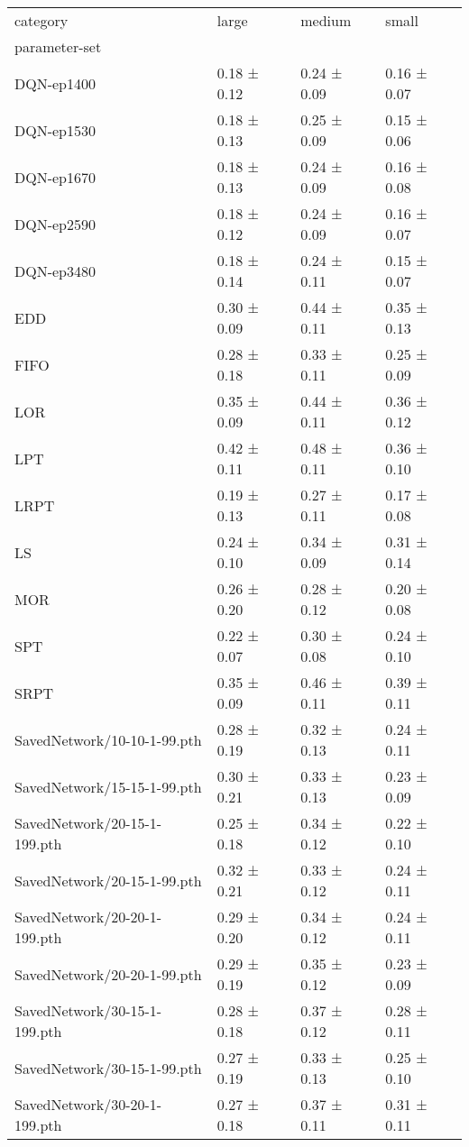 \begin{tabular}{llll}
    \toprule
    category & large & medium & small \\
    parameter-set &  &  &  \\
    \midrule
    DQN-ep1400 & 0.18 ± 0.12 & 0.24 ± 0.09 & 0.16 ± 0.07 \\
    DQN-ep1530 & 0.18 ± 0.13 & 0.25 ± 0.09 & 0.15 ± 0.06 \\
    DQN-ep1670 & 0.18 ± 0.13 & 0.24 ± 0.09 & 0.16 ± 0.08 \\
    DQN-ep2590 & 0.18 ± 0.12 & 0.24 ± 0.09 & 0.16 ± 0.07 \\
    DQN-ep3480 & 0.18 ± 0.14 & 0.24 ± 0.11 & 0.15 ± 0.07 \\
    EDD & 0.30 ± 0.09 & 0.44 ± 0.11 & 0.35 ± 0.13 \\
    FIFO & 0.28 ± 0.18 & 0.33 ± 0.11 & 0.25 ± 0.09 \\
    LOR & 0.35 ± 0.09 & 0.44 ± 0.11 & 0.36 ± 0.12 \\
    LPT & 0.42 ± 0.11 & 0.48 ± 0.11 & 0.36 ± 0.10 \\
    LRPT & 0.19 ± 0.13 & 0.27 ± 0.11 & 0.17 ± 0.08 \\
    LS & 0.24 ± 0.10 & 0.34 ± 0.09 & 0.31 ± 0.14 \\
    MOR & 0.26 ± 0.20 & 0.28 ± 0.12 & 0.20 ± 0.08 \\
    SPT & 0.22 ± 0.07 & 0.30 ± 0.08 & 0.24 ± 0.10 \\
    SRPT & 0.35 ± 0.09 & 0.46 ± 0.11 & 0.39 ± 0.11 \\
    SavedNetwork/10-10-1-99.pth & 0.28 ± 0.19 & 0.32 ± 0.13 & 0.24 ± 0.11 \\
    SavedNetwork/15-15-1-99.pth & 0.30 ± 0.21 & 0.33 ± 0.13 & 0.23 ± 0.09 \\
    SavedNetwork/20-15-1-199.pth & 0.25 ± 0.18 & 0.34 ± 0.12 & 0.22 ± 0.10 \\
    SavedNetwork/20-15-1-99.pth & 0.32 ± 0.21 & 0.33 ± 0.12 & 0.24 ± 0.11 \\
    SavedNetwork/20-20-1-199.pth & 0.29 ± 0.20 & 0.34 ± 0.12 & 0.24 ± 0.11 \\
    SavedNetwork/20-20-1-99.pth & 0.29 ± 0.19 & 0.35 ± 0.12 & 0.23 ± 0.09 \\
    SavedNetwork/30-15-1-199.pth & 0.28 ± 0.18 & 0.37 ± 0.12 & 0.28 ± 0.11 \\
    SavedNetwork/30-15-1-99.pth & 0.27 ± 0.19 & 0.33 ± 0.13 & 0.25 ± 0.10 \\
    SavedNetwork/30-20-1-199.pth & 0.27 ± 0.18 & 0.37 ± 0.11 & 0.31 ± 0.11 \\

\end{tabular}
